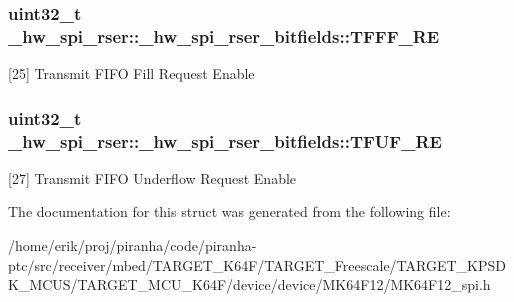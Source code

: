 \subsubsection[{\texorpdfstring{T\+F\+F\+F\+\_\+\+RE}{TFFF_RE}}]{\setlength{\rightskip}{0pt plus 5cm}uint32\+\_\+t \+\_\+hw\+\_\+spi\+\_\+rser\+::\+\_\+hw\+\_\+spi\+\_\+rser\+\_\+bitfields\+::\+T\+F\+F\+F\+\_\+\+RE}\hypertarget{struct__hw__spi__rser_1_1__hw__spi__rser__bitfields_a45ab5f5d5deccd13483f96aae5b33fe4}{}\label{struct__hw__spi__rser_1_1__hw__spi__rser__bitfields_a45ab5f5d5deccd13483f96aae5b33fe4}
\mbox{[}25\mbox{]} Transmit F\+I\+FO Fill Request Enable 
\subsubsection[{\texorpdfstring{T\+F\+U\+F\+\_\+\+RE}{TFUF_RE}}]{\setlength{\rightskip}{0pt plus 5cm}uint32\+\_\+t \+\_\+hw\+\_\+spi\+\_\+rser\+::\+\_\+hw\+\_\+spi\+\_\+rser\+\_\+bitfields\+::\+T\+F\+U\+F\+\_\+\+RE}\hypertarget{struct__hw__spi__rser_1_1__hw__spi__rser__bitfields_a802155fefd466d9220f546fad5816173}{}\label{struct__hw__spi__rser_1_1__hw__spi__rser__bitfields_a802155fefd466d9220f546fad5816173}
\mbox{[}27\mbox{]} Transmit F\+I\+FO Underflow Request Enable 

The documentation for this struct was generated from the following file\+:\begin{DoxyCompactItemize}
\item 
/home/erik/proj/piranha/code/piranha-\/ptc/src/receiver/mbed/\+T\+A\+R\+G\+E\+T\+\_\+\+K64\+F/\+T\+A\+R\+G\+E\+T\+\_\+\+Freescale/\+T\+A\+R\+G\+E\+T\+\_\+\+K\+P\+S\+D\+K\+\_\+\+M\+C\+U\+S/\+T\+A\+R\+G\+E\+T\+\_\+\+M\+C\+U\+\_\+\+K64\+F/device/device/\+M\+K64\+F12/M\+K64\+F12\+\_\+spi.\+h\end{DoxyCompactItemize}
